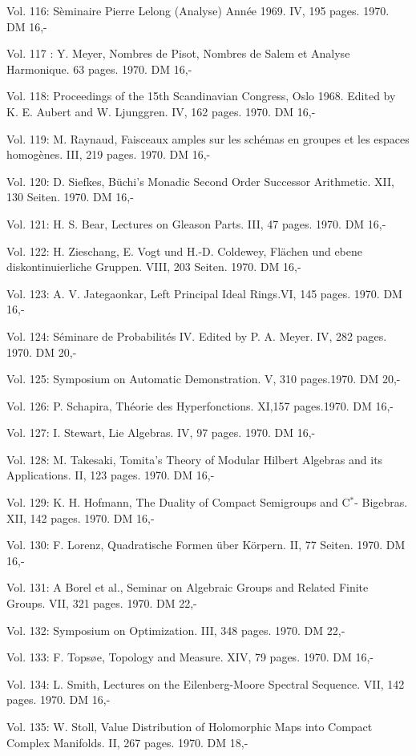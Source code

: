 Vol. 116: Sèminaire Pierre Lelong (Analyse) Année 1969. IV, 195 pages. 1970. DM 16,-

Vol. 117 : Y. Meyer, Nombres de Pisot, Nombres de Salem et Analyse Harmonique. 63 pages. 1970. DM 16,-

Vol. 118: Proceedings of the 15th Scandinavian Congress, Oslo 1968. Edited by K. E. Aubert and W. Ljunggren. IV, 162 pages. 1970. DM 16,-

Vol. 119: M. Raynaud, Faisceaux amples sur les schémas en groupes et les espaces homogènes. III, 219 pages. 1970. DM 16,-

Vol. 120: D. Siefkes, Büchi's Monadic Second Order Successor Arithmetic. XII, 130 Seiten. 1970. DM 16,-

Vol. 121: H. S. Bear, Lectures on Gleason Parts. III, 47 pages. 1970. DM 16,-

Vol. 122: H. Zieschang, E. Vogt und H.-D. Coldewey, Flächen und ebene diskontinuierliche Gruppen. VIII, 203 Seiten. 1970. DM 16,-

Vol. 123: A. V. Jategaonkar, Left Principal Ideal Rings.VI, 145 pages. 1970. DM 16,-

Vol. 124: Séminare de Probabilités IV. Edited by P. A. Meyer. IV, 282 pages. 1970. DM 20,-

Vol. 125: Symposium on Automatic Demonstration. V, 310 pages.1970. DM 20,-

Vol. 126: P. Schapira, Théorie des Hyperfonctions. XI,157 pages.1970. DM 16,-

Vol. 127: I. Stewart, Lie Algebras. IV, 97 pages. 1970. DM 16,-

Vol. 128: M. Takesaki, Tomita's Theory of Modular Hilbert Algebras and its Applications. II, 123 pages. 1970. DM 16,-

Vol. 129: K. H. Hofmann, The Duality of Compact Semigroups and C$^*$- Bigebras. XII, 142 pages. 1970. DM 16,-

Vol. 130: F. Lorenz, Quadratische Formen über Körpern. II, 77 Seiten. 1970. DM 16,-

Vol. 131: A Borel et al., Seminar on Algebraic Groups and Related Finite Groups. VII, 321 pages. 1970. DM 22,-

Vol. 132: Symposium on Optimization. III, 348 pages. 1970. DM 22,-

Vol. 133: F. Topsøe, Topology and Measure. XIV, 79 pages. 1970. DM 16,-

Vol. 134: L. Smith, Lectures on the Eilenberg-Moore Spectral Sequence. VII, 142 pages. 1970. DM 16,-

Vol. 135: W. Stoll, Value Distribution of Holomorphic Maps into Compact Complex Manifolds. II, 267 pages. 1970. DM 18,-

